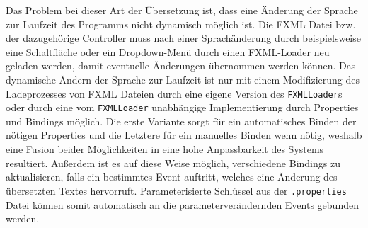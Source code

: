 \noindent Das Problem bei dieser Art der Übersetzung ist, dass eine Änderung der Sprache zur Laufzeit des Programms nicht dynamisch möglich ist. Die FXML Datei bzw. der dazugehörige Controller muss nach einer Sprachänderung durch beispielsweise eine Schaltfläche oder ein Dropdown-Menü durch einen FXML-Loader neu geladen werden, damit eventuelle Änderungen übernommen werden können. Das dynamische Ändern der Sprache zur Laufzeit ist nur mit einem Modifizierung des Ladeprozesses von FXML Dateien durch eine eigene Version des \texttt{FXMLLoader}s oder durch eine vom \texttt{FXMLLoader} unabhängige Implementierung durch Properties und Bindings möglich. Die erste Variante sorgt für ein automatisches Binden der nötigen Properties und die Letztere für ein manuelles Binden wenn nötig, weshalb eine Fusion beider Möglichkeiten in eine hohe Anpassbarkeit des Systems resultiert. Außerdem ist es auf diese Weise möglich, verschiedene Bindings zu aktualisieren, falls ein bestimmtes Event auftritt, welches eine Änderung des übersetzten Textes hervorruft. Parameterisierte Schlüssel aus der \texttt{.properties} Datei können somit automatisch an die parameterverändernden Events gebunden werden.
